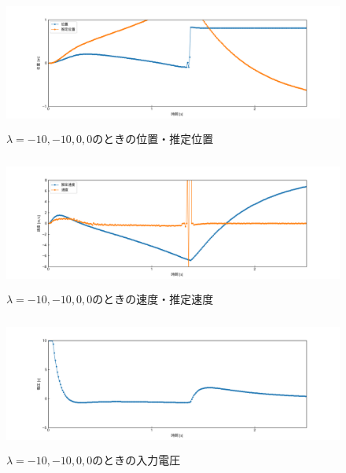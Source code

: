 \documentclass[12pt]{jsarticle}
\begin{document}
\begin{figure}[H]
  \begin{center}
    \includegraphics[clip,width=13.0cm, height=4.4cm]{../img/Exp7-1.png}
    \caption{$\lambda=-10, -10, 0, 0$のときの位置・推定位置}
    \label{Exp7-1}
  \end{center}
\end{figure}
\begin{figure}[H]
  \begin{center}
    \includegraphics[clip,width=13.0cm, height=4.4cm]{../img/Exp7-2.png}
    \caption{$\lambda=-10, -10, 0, 0$のときの速度・推定速度}
    \label{Exp7-2}
  \end{center}
\end{figure}
\begin{figure}[H]
  \begin{center}
    \includegraphics[clip,width=13.0cm, height=4.4cm]{../img/Exp7-3.png}
    \caption{$\lambda=-10, -10, 0, 0$のときの入力電圧}
    \label{Exp7-3}
  \end{center}
\end{figure}
\end{document}
